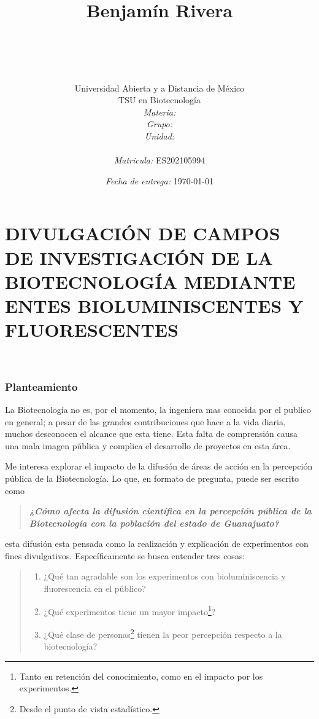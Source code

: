\documentclass[12pt]{article}
\title{
	\ \\ Benjam\'in Rivera \\
	\bf{\titulo}\\\ \\}
\author{
	{\Huge Universidad Abierta y a Distancia de México} \\
	TSU en Biotecnolog\'ia \\
	\textit{Materia:} \materia \\
	\textit{Grupo:} \grupo \\
	\textit{Unidad:} \unidad \\
	\\
	\textit{Matricula:} ES202105994 }
\date{\textit{Fecha de entrega:} \today}
\newcommand{\tema}[0]{divulgación de campos de investigación de la biotecnología mediante entes bioluminiscentes y fluorescentes}
\begin{document}
\maketitle\newpage

\tableofcontents
\listoffigures
\newpage

\part*{\MakeUppercase{\tema}}
\ \\


\section{Planteamiento}
	
	\par La Biotecnología no es, por el momento, la ingeniera mas conocida por el publico en general; a pesar de las grandes contribuciones que hace a la vida diaria, muchos desconocen el alcance que esta tiene. Esta falta de comprensión causa una mala imagen pública y complica el desarrollo de proyectos en esta área.
	\par Me interesa explorar el impacto de la difusión de áreas de acción en la percepción pública de la Biotecnología. Lo que, en formato de pregunta, puede ser escrito como
	\begin{quote}
		\textbf{\textit{¿Cómo afecta la difusión científica en la percepción pública de la Biotecnología con la población del estado de Guanajuato?}}
	\end{quote}
	  
	\noindent esta difusión esta pensada como la realización y explicación de experimentos con fines divulgativos. Específicamente se busca entender tres cosas:
	
	\begin{quote}
	\begin{enumerate}\it
			\item ¿Qué tan agradable son los experimentos con bioluminiscencia y fluorescencia en el público?
			\item ¿Qué experimentos tiene un mayor impacto\footnote{Tanto en retención del conocimiento, como en el impacto por los experimentos.}?
			\item ¿Qué clase de personas\footnote{Desde el punto de vista estadístico.} tienen la peor percepción respecto a la biotecnología? 
	\end{enumerate}
	\end{quote}
\end{document}
